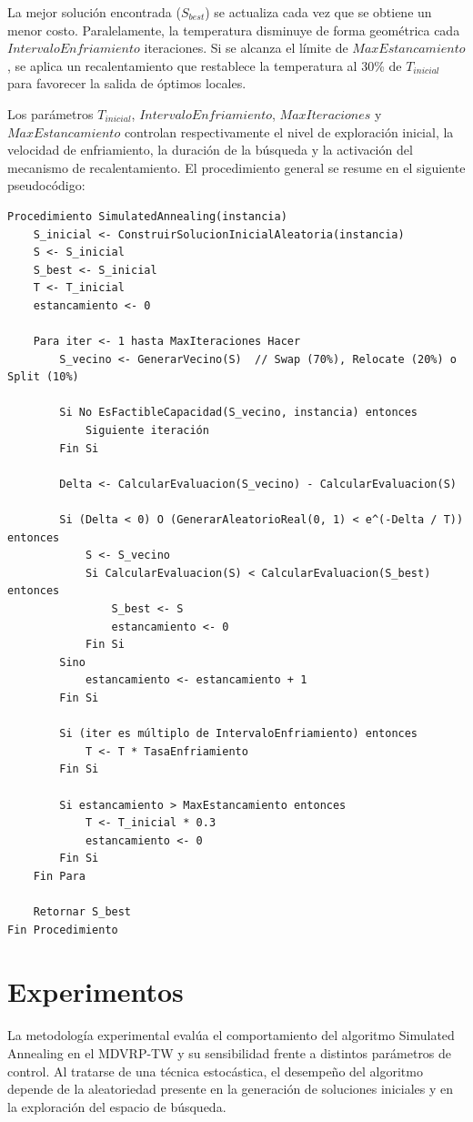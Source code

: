 \documentclass[letter, 10pt, dvipdfmx]{article}
\begin{document}
La mejor solución encontrada ($S_{best}$) se actualiza cada vez que se obtiene un menor costo. Paralelamente,
la temperatura disminuye de forma geométrica cada $IntervaloEnfriamiento$ iteraciones. Si se alcanza el límite
de $MaxEstancamiento$, se aplica un recalentamiento que restablece la temperatura al 30\% de $T_{inicial}$
para favorecer la salida de óptimos locales.

Los parámetros $T_{inicial}$, $IntervaloEnfriamiento$, $MaxIteraciones$ y $MaxEstancamiento$ controlan
respectivamente el nivel de exploración inicial, la velocidad de enfriamiento, la duración de la búsqueda
y la activación del mecanismo de recalentamiento. El procedimiento general se resume en el siguiente pseudocódigo:

{\footnotesize
\begin{verbatim}
Procedimiento SimulatedAnnealing(instancia)
    S_inicial <- ConstruirSolucionInicialAleatoria(instancia)
    S <- S_inicial
    S_best <- S_inicial
    T <- T_inicial
    estancamiento <- 0

    Para iter <- 1 hasta MaxIteraciones Hacer
        S_vecino <- GenerarVecino(S)  // Swap (70%), Relocate (20%) o Split (10%)
        
        Si No EsFactibleCapacidad(S_vecino, instancia) entonces
            Siguiente iteración
        Fin Si

        Delta <- CalcularEvaluacion(S_vecino) - CalcularEvaluacion(S)

        Si (Delta < 0) O (GenerarAleatorioReal(0, 1) < e^(-Delta / T)) entonces
            S <- S_vecino
            Si CalcularEvaluacion(S) < CalcularEvaluacion(S_best) entonces
                S_best <- S
                estancamiento <- 0
            Fin Si
        Sino
            estancamiento <- estancamiento + 1
        Fin Si

        Si (iter es múltiplo de IntervaloEnfriamiento) entonces
            T <- T * TasaEnfriamiento
        Fin Si
        
        Si estancamiento > MaxEstancamiento entonces
            T <- T_inicial * 0.3
            estancamiento <- 0
        Fin Si
    Fin Para

    Retornar S_best
Fin Procedimiento
\end{verbatim}
}

\section{Experimentos}
La metodología experimental evalúa el comportamiento del algoritmo Simulated Annealing en el MDVRP-TW y su sensibilidad frente a distintos parámetros de control. Al tratarse de una técnica estocástica, el desempeño del algoritmo depende de la aleatoriedad presente en la generación de soluciones iniciales y en la exploración del espacio de búsqueda.
\end{document}
